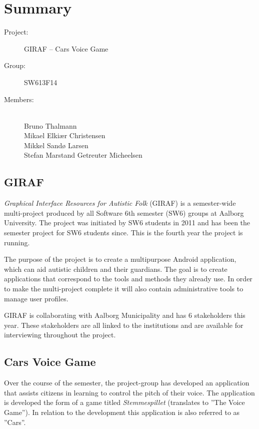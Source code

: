 \documentclass[a4paper,12pt,english]{article}
\begin{document}
\section*{\Huge Summary}

\begin{description}
\item[Project:] GIRAF -- Cars Voice Game
\item[Group:] SW613F14
\item[Members:] ~ \\
	Bruno Thalmann \\
	Mikael Elki\ae r Christensen \\
	Mikkel Sand\o{} Larsen \\
	Stefan Marstand Getreuter Micheelsen
\end{description}

\subsection*{GIRAF}
\textit{Graphical Interface Resources for Autistic Folk} (GIRAF) is a semester-wide multi-project produced by all Software 6th semester (SW6) groups at Aalborg University.
The project was initiated by SW6 students in 2011 and has been the semester project for SW6 students since.
This is the fourth year the project is running.

The purpose of the project is to create a multipurpose Android application, which can aid autistic children and their guardians.
The goal is to create applications that correspond to the tools and methods they already use.
In order to make the multi-project complete it will also contain administrative tools to manage user profiles.

GIRAF is collaborating with Aalborg Municipality and has 6 stakeholders this year.
These stakeholders are all linked to the institutions and are available for interviewing throughout the project.

\subsection*{Cars Voice Game}
Over the course of the semester, the project-group has developed an application that assists citizens in learning to control the pitch of their voice.
The application is developed the form of a game titled \textit{Stemmespillet} (translates to ''The Voice Game'').
In relation to the development this application is also referred to as ''Cars''.
\end{document}

